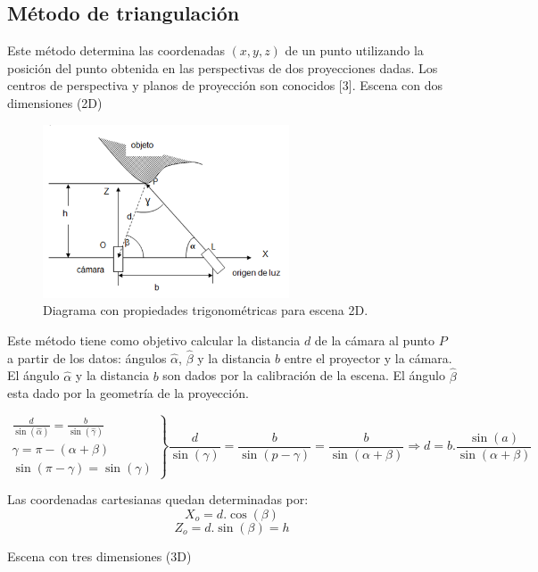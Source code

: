 \subsection{Método de triangulación}
Este método determina las coordenadas $(x,y,z)$ de un punto utilizando la posición del punto obtenida en las perspectivas de dos proyecciones dadas.
Los centros de perspectiva y planos de proyección son conocidos [3].%
Escena con dos dimensiones (2D)

\begin{figure}[H]
  \centering
    \includegraphics[width=0.65\textwidth]{./Cap6_reconstruccion/triangulacion.PNG}
  \caption{Diagrama con propiedades trigonométricas para escena 2D.}
  \label{fig:Triangulacion}
\end{figure}

Este método tiene como objetivo calcular la distancia $d$ de la cámara al punto $P$ a partir de los datos: ángulos $\hat\alpha$, $\hat\beta$ y la distancia $b$ entre el proyector y la cámara.
El ángulo $\hat\alpha$ y la distancia $b$ son dados por la calibración de la escena.
El ángulo $\hat\beta$ esta dado por la geometría de la proyección.

\[
\left.
\begin{array}{l}
\frac{d}{\sin (\hat\alpha)} = \frac{b}{\sin (\hat\gamma)} 	\\
\gamma = \pi - (\alpha + \beta)								\\
\sin (\pi - \gamma) = \sin (\gamma)
\end{array}
\right \rbrace
\frac{d}{\sin(\gamma)} = \frac{b}{\sin(p - \gamma)} = \frac{b}{\sin(\alpha + \beta)} \Rightarrow d = b . \frac{\sin(a)}{\sin(\alpha + \beta)}
\]

Las coordenadas cartesianas quedan determinadas por:
\[
X_o = d. \cos (\beta)
\]
\[
Z_o = d. \sin (\beta) = h
\]

Escena con tres dimensiones (3D)

